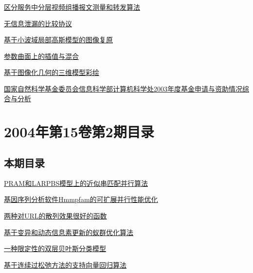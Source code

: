 \documentclass[a4paper]{article}
\begin{document}
\href{http://www.jos.org.cn/ch/reader/download_pdf.aspx?file_no=20040310&year_id=2004&quarter_id=3&falg=1}{区分服务中分层视频组播报文测量和转发算法}

\href{http://www.jos.org.cn/ch/reader/download_pdf.aspx?file_no=20040311&year_id=2004&quarter_id=3&falg=1}{无信息泄漏的比较协议}

\href{http://www.jos.org.cn/ch/reader/download_pdf.aspx?file_no=20040313&year_id=2004&quarter_id=3&falg=1}{基于小波域局部高斯模型的图像复原}

\href{http://www.jos.org.cn/ch/reader/download_pdf.aspx?file_no=20040314&year_id=2004&quarter_id=3&falg=1}{参数曲面上的插值与混合}

\href{http://www.jos.org.cn/ch/reader/download_pdf.aspx?file_no=20040315&year_id=2004&quarter_id=3&falg=1}{基于图像化几何的三维模型彩绘}

\href{http://www.jos.org.cn/ch/reader/download_pdf.aspx?file_no=20040316&year_id=2004&quarter_id=3&falg=1}{国家自然科学基金委员会信息科学部计算机科学处2003年度基金申请与资助情况综合与分析}


\section{\textbf{2004年第15卷第2期目录}}
\subsection{本期目录}
\href{http://www.jos.org.cn/ch/reader/download_pdf.aspx?file_no=20040201&year_id=2004&quarter_id=2&falg=1}{PRAM和LARPBS模型上的近似串匹配并行算法}

\href{http://www.jos.org.cn/ch/reader/download_pdf.aspx?file_no=20040202&year_id=2004&quarter_id=2&falg=1}{基因序列分析软件Hmmpfam的可扩展并行性能优化}

\href{http://www.jos.org.cn/ch/reader/download_pdf.aspx?file_no=20040203&year_id=2004&quarter_id=2&falg=1}{两种对URL的散列效果很好的函数}

\href{http://www.jos.org.cn/ch/reader/download_pdf.aspx?file_no=20040204&year_id=2004&quarter_id=2&falg=1}{基于变异和动态信息素更新的蚁群优化算法}

\href{http://www.jos.org.cn/ch/reader/download_pdf.aspx?file_no=20040205&year_id=2004&quarter_id=2&falg=1}{一种限定性的双层贝叶斯分类模型}

\href{http://www.jos.org.cn/ch/reader/download_pdf.aspx?file_no=20040206&year_id=2004&quarter_id=2&falg=1}{基于连续过松弛方法的支持向量回归算法}
\end{document}
